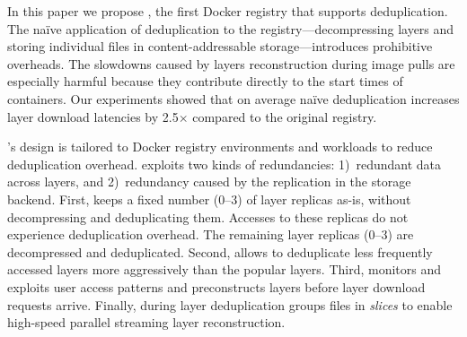 
In this paper we propose \emph{\sysname}, the first Docker registry that
supports deduplication.
%
The na\"{i}ve application of deduplication to the registry---decompressing
layers and storing individual files in content-addressable storage---introduces
prohibitive overheads.
%
The slowdowns caused by layers reconstruction during image pulls are especially
harmful because they contribute directly to the start times of containers.
%
Our experiments showed that on average na\"{i}ve deduplication increases layer
download latencies by 2.5$\times$ compared to the original registry.

%
\sysname's design is tailored to Docker registry environments and workloads to
reduce deduplication overhead.
%
\sysname exploits two kinds of redundancies: 1)~redundant data across layers,
and 2)~redundancy caused by the replication in the storage backend.
%
First, \sysname keeps a fixed number (0--3) of layer replicas as-is, without
decompressing and deduplicating them.
%
Accesses to these replicas do not experience deduplication overhead.
%
The remaining layer replicas (0--3) are decompressed and deduplicated.
%
Second, \sysname allows to deduplicate less frequently accessed layers more
aggressively than the popular layers.
%
Third, \sysname monitors and exploits user access patterns and preconstructs
layers before layer download requests arrive.
%
Finally, during layer deduplication \sysname groups files in \emph{slices} to
enable high-speed parallel streaming layer reconstruction.
%



%
